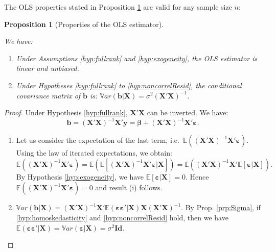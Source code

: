 \documentclass[
  11pt,
]{book}
\providecommand{\tightlist}{%
  \setlength{\itemsep}{0pt}\setlength{\parskip}{0pt}}
\newtheorem{proposition}{Proposition}[chapter]
\theoremstyle{definition}
\theoremstyle{definition}
\theoremstyle{definition}
\theoremstyle{definition}
\theoremstyle{remark}
\begin{document}
The OLS properties stated in Proposition \ref{prp:propOLS} are valid for any sample size \(n\):

\begin{proposition}[Properties of the OLS estimator]
\protect\hypertarget{prp:propOLS}{}\label{prp:propOLS}

We have:

\begin{enumerate}
\def\labelenumi{\roman{enumi}.}
\item
  Under Assumptions \ref{hyp:fullrank} and \ref{hyp:exogeneity}, the OLS estimator is linear and unbiased.
\item
  Under Hypotheses \ref{hyp:fullrank} to \ref{hyp:noncorrelResid}, the conditional covariance matrix of \(\mathbf{b}\) is: \(\mathbb{V}ar(\mathbf{b}|\mathbf{X}) = \sigma^2 (\mathbf{X}'\mathbf{X})^{-1}\).
\end{enumerate}

\end{proposition}

\begin{proof}

Under Hypothesis \ref{hyp:fullrank}, \(\mathbf{X}'\mathbf{X}\) can be inverted. We have:
\[
\mathbf{b} = (\mathbf{X}'\mathbf{X})^{-1} \mathbf{X}'\mathbf{y} = \boldsymbol\beta + (\mathbf{X}'\mathbf{X})^{-1} \mathbf{X}' {\boldsymbol\varepsilon}.
\]

\begin{enumerate}
\def\labelenumi{\roman{enumi}.}
\tightlist
\item
  Let us consider the expectation of the last term, i.e.~\(\mathbb{E}((\mathbf{X}'\mathbf{X})^{-1} \mathbf{X}' {\boldsymbol\varepsilon})\). Using the law of iterated expectations, we obtain:
  \[
  \mathbb{E}((\mathbf{X}'\mathbf{X})^{-1} \mathbf{X}' {\boldsymbol\varepsilon}) = \mathbb{E}(\mathbb{E}[(\mathbf{X}'\mathbf{X})^{-1} \mathbf{X}' {\boldsymbol\varepsilon}|\mathbf{X}]) = \mathbb{E}((\mathbf{X}'\mathbf{X})^{-1} \mathbf{X}'\mathbb{E}[{\boldsymbol\varepsilon}|\mathbf{X}]).
  \]
  By Hypothesis \ref{hyp:exogeneity}, we have \(\mathbb{E}[{\boldsymbol\varepsilon}|\mathbf{X}]=0\). Hence \(\mathbb{E}((\mathbf{X}'\mathbf{X})^{-1} \mathbf{X}' {\boldsymbol\varepsilon}) =0\) and result (i) follows.
\item
  \(\mathbb{V}ar(\mathbf{b}|\mathbf{X}) = (\mathbf{X}'\mathbf{X})^{-1} \mathbf{X}' \mathbb{E}(\boldsymbol\varepsilon\boldsymbol\varepsilon'|\mathbf{X}) \mathbf{X} (\mathbf{X}'\mathbf{X})^{-1}\).
  By Prop. \ref{prp:Sigma}, if \ref{hyp:homoskedasticity} and \ref{hyp:noncorrelResid} hold, then we have \(\mathbb{E}(\boldsymbol\varepsilon\boldsymbol\varepsilon'|\mathbf{X})=\mathbb{V}ar(\boldsymbol\varepsilon|\mathbf{X})=\sigma^2 \mathbf{Id}\).
\end{enumerate}

\end{proof}
\end{document}
